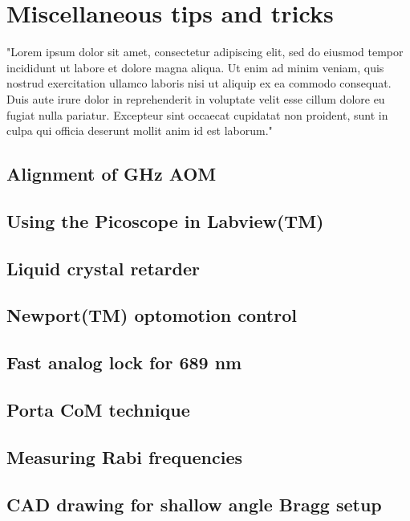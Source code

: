 \chapter{Miscellaneous tips and tricks}
"Lorem ipsum dolor sit amet, consectetur adipiscing elit, sed do eiusmod tempor incididunt ut labore et dolore magna aliqua. Ut enim ad minim veniam, quis nostrud exercitation ullamco laboris nisi ut aliquip ex ea commodo consequat. Duis aute irure dolor in reprehenderit in voluptate velit esse cillum dolore eu fugiat nulla pariatur. Excepteur sint occaecat cupidatat non proident, sunt in culpa qui officia deserunt mollit anim id est laborum."

\section{Alignment of GHz AOM}
\section{Using the Picoscope in Labview(TM)}
\section{Liquid crystal retarder}
\section{Newport(TM) optomotion control}
\section{Fast analog lock for 689 nm}
\section{Porta CoM technique}
\section{Measuring Rabi frequencies}
\section{CAD drawing for shallow angle Bragg setup}
